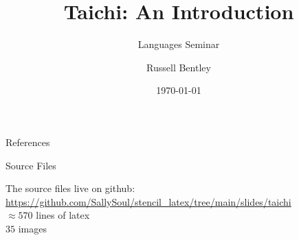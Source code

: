 \documentclass{beamer}[10pt]
\title{Taichi: An Introduction}
\subtitle{Languages Seminar}
\author{Russell Bentley}
\institute{Stony Brook}
\date{\today}
\begin{document}
\frame{\titlepage}



























\placelogofalse
\begin{frame}[allowframebreaks]{References}
    \tiny
    \printbibliography
\end{frame}
\placelogotrue

\begin{frame}{Source Files}
\begin{center}
  The source files live on github:\\
  \url{https://github.com/SallySoul/stencil_latex/tree/main/slides/taichi}\\
  $\approx 570$ lines of latex \\
  $35$ images
\end{center}
\end{frame}
\end{document}
